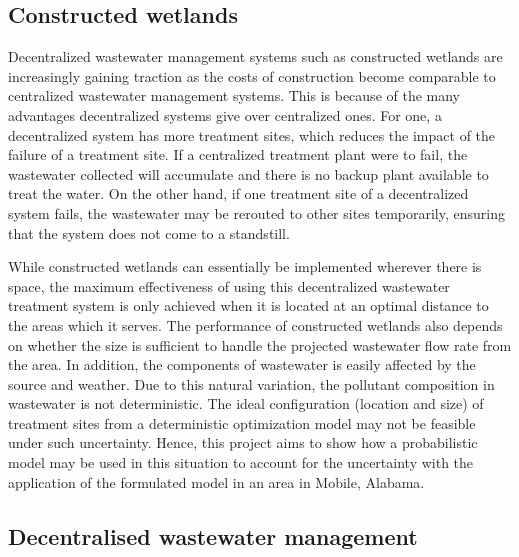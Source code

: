 \documentclass[preprint,12pt,authoryear]{elsarticle}
\begin{document}

\subsection{Constructed wetlands}
Decentralized wastewater management systems such as constructed wetlands are increasingly gaining traction as the costs of construction become comparable to centralized wastewater management systems. This is because of the many advantages decentralized systems give over centralized ones. For one, a decentralized system has more treatment sites, which reduces the impact of the failure of a treatment site. If a centralized treatment plant were to fail, the wastewater collected will accumulate and there is no backup plant available to treat the water. On the other hand, if one treatment site of a decentralized system fails, the wastewater may be rerouted to other sites temporarily, ensuring that the system does not come to a standstill. 

While constructed wetlands can essentially be implemented wherever there is space, the maximum effectiveness of using this decentralized wastewater treatment system is only achieved when it is located at an optimal distance to the areas which it serves. The performance of constructed wetlands also depends on whether the size is sufficient to handle the projected wastewater flow rate from the area. In addition, the components of wastewater is easily affected by the source and weather. Due to this natural variation, the pollutant composition in wastewater is not deterministic. The ideal configuration (location and size) of treatment sites from a deterministic optimization model may not be feasible under such uncertainty. Hence, this project aims to show how a probabilistic model may be used in this situation to account for the uncertainty with the application of the formulated model in an area in Mobile, Alabama. 

\subsection{Decentralised wastewater management}
\end{document}

